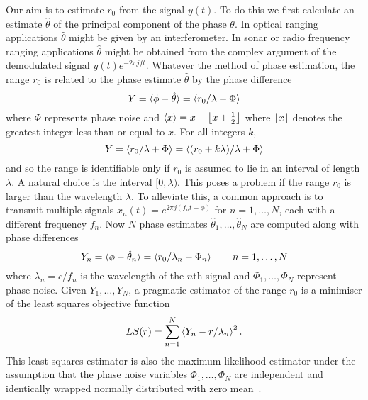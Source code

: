 \documentclass[10pt,twocolumn,twoside]{IEEEtran}
\begin{document}
Our aim is to estimate $r_0$ from the signal $y(t)$.  To do this we first calculate an estimate $\hat{\theta}$ of the principal component of the phase $\theta$.  In optical ranging applications $\hat{\theta}$ might be given by an interferometer.  In sonar or radio frequency ranging applications $\hat{\theta}$ might be obtained from the complex argument of the demodulated signal $y(t)e^{-2\pi j f t}$.  Whatever the method of phase estimation, the range $r_0$ is related to the phase estimate $\hat{\theta}$ by the phase difference
\begin{equation}
Y = \langle \phi - \hat{\theta} \rangle = \langle  r_0/\lambda + \Phi  \rangle
\end{equation}
where $\Phi$ represents phase noise and $\langle x \rangle = x - {\left\lfloor x + \tfrac{1}{2} \right\rfloor}$ where ${\left\lfloor x \right\rfloor}$ denotes the greatest integer less than or equal to $x$.  %
For all integers $k$, 
\begin{equation}
Y = \left\langle  r_0/\lambda + \Phi  \right\rangle = \langle (r_0 + k\lambda)/\lambda + \Phi \rangle
\end{equation}
and so the range is identifiable only if $r_0$ is assumed to lie in an interval of length $\lambda$.  A natural choice is the interval $[0, \lambda)$. This poses a problem if the range $r_0$ is larger than the wavelength $\lambda$.  To alleviate this, a common approach is to transmit multiple signals %
$x_n(t) = e^{2\pi j (f_nt + \phi)}$ for $n = 1,\dots,N$, each with a different frequency $f_n$.  Now $N$ phase estimates $\hat{\theta}_1,\dots,\hat{\theta}_N$ are computed along with phase differences 
\begin{equation}\label{eq:Yndefn}
Y_n = \sfracpart{\phi - \hat{\theta}_n} = \fracpart{ r_0/\lambda_n + \Phi_n} \qquad n = 1,\dots,N
\end{equation}
where $\lambda_n = c/f_n$ is the wavelength of the $n$th signal and $\Phi_1,\dots,\Phi_N$ represent phase noise.  Given $Y_1,\dots,Y_N$, a pragmatic estimator of the range $r_0$ is a minimiser of the least squares objective function
\begin{equation}
LS(r) = \sum_{n=1}^N \left\langle Y_n - r/\lambda_n \right\rangle^2.
\end{equation}
This least squares estimator is also the maximum likelihood estimator under the assumption that the phase noise variables $\Phi_1,\dots,\Phi_N$ are independent and identically wrapped normally distributed with zero mean~\cite[p.~50]{Mardia_directional_statistics}\cite[p.~76]{McKilliam2010thesis}\cite[p.~47]{Fisher1993}.
\end{document}
